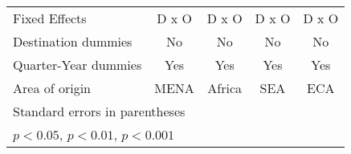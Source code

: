 \begin{table}[htbp]
\begin{tabular}{l*{4}{c}}
Fixed Effects       &       D x O         &       D x O         &       D x O         &       D x O         \\
Destination dummies &          No         &          No         &          No         &          No         \\
Quarter-Year dummies&         Yes         &         Yes         &         Yes         &         Yes         \\
Area of origin      &        MENA         &      Africa         &         SEA         &         ECA         \\
\hline\hline
\multicolumn{5}{l}{\footnotesize Standard errors in parentheses}\\
\multicolumn{5}{l}{\footnotesize \sym{*} \(p<0.05\), \sym{**} \(p<0.01\), \sym{***} \(p<0.001\)}\\
\end{tabular}
\end{table}
